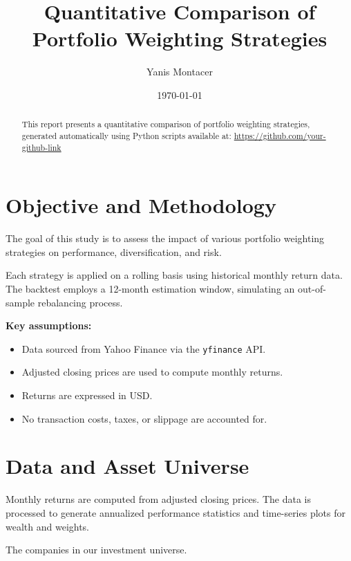 \documentclass{article}
\title{Quantitative Comparison of Portfolio Weighting Strategies}
\author{Yanis Montacer}
\date{\today}
\begin{document}
\maketitle

\begin{abstract}
This report presents a quantitative comparison of portfolio weighting strategies, generated automatically using Python scripts available at:
\href{https://github.com/your-github-link}{https://github.com/your-github-link}
\end{abstract}

\section{Objective and Methodology}

The goal of this study is to assess the impact of various portfolio weighting strategies on performance, diversification, and risk.


Each strategy is applied on a rolling basis using historical monthly return data. The backtest employs a 12-month estimation window, simulating an out-of-sample rebalancing process.

\textbf{Key assumptions:}
\begin{itemize}
    \item Data sourced from Yahoo Finance via the \texttt{yfinance} API.
    \item Adjusted closing prices are used to compute monthly returns.
    \item Returns are expressed in USD.
    \item No transaction costs, taxes, or slippage are accounted for.
\end{itemize}


\section{Data and Asset Universe}

Monthly returns are computed from adjusted closing prices. The data is processed to generate annualized performance statistics and time-series plots for wealth and weights.
\begin{table}[H]
    \centering
    \caption{The companies in our investment universe.}
    \label{tab:company_names}
    \begin{adjustbox}{max width=\textwidth}
        
    \end{adjustbox}
\end{table}
\end{document}
